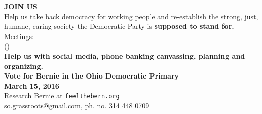 \newcommand{\checkbox}{\makebox[0pt][l]{$\square$}\raisebox{.15ex}{\hspace{0.1em}$\checkmark$}}

\vspace{-10pt}

\begin{center}
  {\Huge\bf\underline{JOIN US}}\\[10pt]

  Help us take back democracy for working people and re-establish the
  strong, just, humane, caring society the Democratic Party is {\bf
    supposed to stand for.}\\[10pt]

Meetings: \MeetingTime\ \MeetingAddress\\
(\MeetingPlacename)\\[10pt]

{\bf
Help us with social media, phone banking
canvassing, planning and organizing.\\[10pt]

Vote for Bernie in the Ohio Democratic Primary\\
March 15, 2016
}\\[10pt]

Research Bernie at {\tt feelthebern.org}\\[10pt]

so.grassroots@gmail.com, ph. no. 314 448 0709
\vspace{-35pt}
\end{center}	
